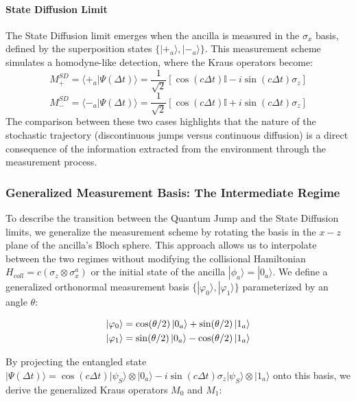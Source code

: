 \documentclass[a4paper,12pt]{article}
\begin{document}
\paragraph{State Diffusion Limit}
The State Diffusion limit emerges when the ancilla is measured in the $\sigma_x$ basis, defined by the superposition states $\{|+_a\rangle, |-_a\rangle\}$. This measurement scheme simulates a homodyne-like detection, where the Kraus operators become:
\begin{equation}
	M_+^{SD} = \langle +_a | \Psi(\Delta t) \rangle = \frac{1}{\sqrt{2}} \left[ \cos(c\Delta t) \mathbb{I} - i \sin(c\Delta t) \sigma_z \right]
\end{equation}
\begin{equation}
	M_-^{SD} = \langle -_a | \Psi(\Delta t) \rangle = \frac{1}{\sqrt{2}} \left[ \cos(c\Delta t) \mathbb{I} + i \sin(c\Delta t) \sigma_z \right]
\end{equation}
The comparison between these two cases highlights that the nature of the stochastic trajectory (discontinuous jumps versus continuous diffusion) is a direct consequence of the information extracted from the environment through the measurement process.

\subsubsection{Generalized Measurement Basis: The Intermediate Regime}

To describe the transition between the Quantum Jump and the State Diffusion limits, we generalize the measurement scheme by rotating the basis in the $x-z$ plane of the ancilla's Bloch sphere. This approach allows us to interpolate between the two regimes without modifying the collisional Hamiltonian $H_{coll} = c (\sigma_z \otimes \sigma_x^a)$ or the initial state of the ancilla $|\phi_a\rangle = |0_a\rangle$. We define a generalized orthonormal measurement basis $\{|\varphi_0\rangle, |\varphi_1\rangle\}$ parameterized by an angle $\theta$:

\begin{gather}
	\ket{\varphi_0} = \cos(\theta/2)\ket{0_a} + \sin(\theta/2)\ket{1_a} \\
	\ket{\varphi_1} = \sin(\theta/2)\ket{0_a} - \cos(\theta/2)\ket{1_a}
\end{gather}

By projecting the entangled state $|\Psi(\Delta t)\rangle = \cos(c\Delta t) |\psi_S\rangle \otimes |0_a\rangle - i \sin(c\Delta t) \sigma_z |\psi_S\rangle \otimes |1_a\rangle$ onto this basis, we derive the generalized Kraus operators $M_0$ and $M_1$:
\end{document}
